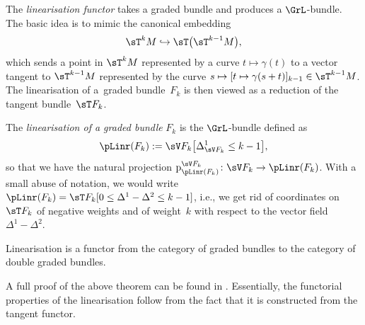 The \emph{linearisation functor} takes a graded bundle and produces a $\GrL$-bundle. The basic idea is to mimic the canonical embedding
\begin{gather*}
\sT^{k}M \hookrightarrow \sT\big(\sT^{k-1}M\big),
 \end{gather*}
which sends a point in $\sT^k M$ represented by a curve $t \mapsto \gamma(t)$ to a vector tangent to $\sT^{k-1} M$ represented by the curve $s\mapsto [t\mapsto \gamma(s+t)]_{k-1}\in \sT^{k-1} M$. The linearisation of a~graded bundle~$F_{k}$ is then viewed as a reduction of the tangent bundle~$\sT F_{k}$.
\begin{Definition}\label{def:linearisation}
The \emph{linearisation of a graded bundle} $F_{k}$ is the $\GrL$-bundle def\/ined as
\begin{gather*}
\pLinr (F_{k}) := \sV F_{k}\big[\Delta_{\sV F_{k}}^{1} \leq k-1\big],
\end{gather*}
so that we have the natural projection $\textnormal{p}^{\sV F_{k}}_{\pLinr(F_{k})}\colon \sV F_{k} \rightarrow \pLinr(F_{k})$. With a small abuse of notation, we would write $\pLinr (F_k) = \sT F_k[0\leq \Delta^1 - \Delta^2 \leq k-1]$, i.e., we get rid of coordinates on~$\sT F_k$ of negative weights and of weight~$k$ with respect to the vector f\/ield $\Delta^1 - \Delta^2$.
\end{Definition}

\begin{Theorem}\label{theom:functorial linearisation}
Linearisation is a functor from the category of graded bundles to the category of double graded bundles.
\end{Theorem}

A full proof of the above theorem can be found in \cite{Bruce:2014}. Essentially, the functorial properties of the linearisation follow from the fact that it is constructed from the tangent functor.

